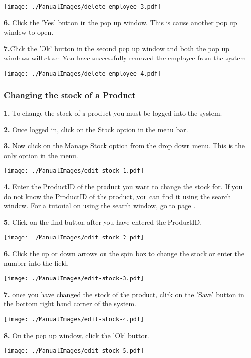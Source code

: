 \texttt{[image: ./ManualImages/delete-employee-3.pdf]}

\textbf{6.} Click the 'Yes' button in the pop up window. This is cause another pop up window to open.

\textbf{7.}Click the 'Ok' button in the second pop up window and both the pop up windows will close. You have successfully removed the employee from the system.

\texttt{[image: ./ManualImages/delete-employee-4.pdf]}

\pagebreak
\subsubsection{Changing the stock of a Product}
\label{fig:Changing the stock of a Product}

\textbf{1.} To change the stock of a product you must be logged into the system.

\textbf{2.} Once logged in, click on the Stock option in the menu bar.

\textbf{3.} Now click on the Manage Stock option from the drop down menu. This is the only option in the menu.

\texttt{[image: ./ManualImages/edit-stock-1.pdf]}

\textbf{4.} Enter the ProductID of the product you want to change the stock for. If you do not know the ProductID of the product, you can find it using the search window. For a tutorial on using the search window, go to page \pageref{fig:Using the search window}.

\textbf{5.} Click on the find button after you have entered the ProductID.

\texttt{[image: ./ManualImages/edit-stock-2.pdf]}

\textbf{6.} Click the up or down arrows on the spin box to change the stock or enter the number into the field.

\texttt{[image: ./ManualImages/edit-stock-3.pdf]}

\textbf{7.} once you have changed the stock of the product, click on the 'Save' button in the bottom right hand corner of the system.

\texttt{[image: ./ManualImages/edit-stock-4.pdf]}

\textbf{8.} On the pop up window, click the 'Ok' button.

\texttt{[image: ./ManualImages/edit-stock-5.pdf]}

